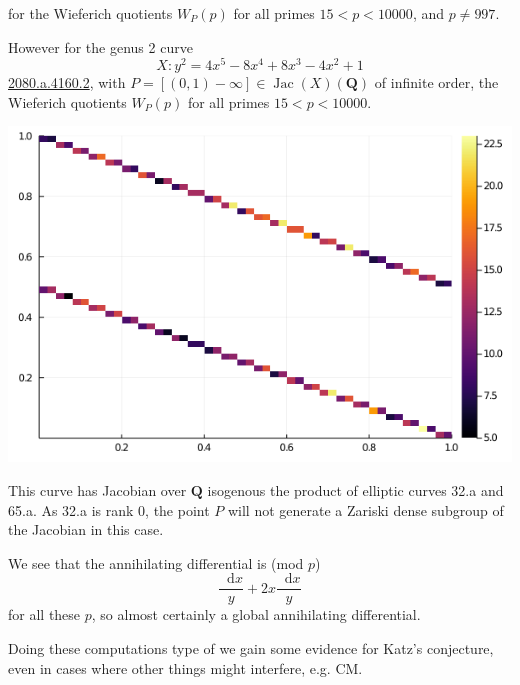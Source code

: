 \documentclass[oneside,11pt,]{article}
\DeclareMathOperator{\Jac}{Jac}
\newcommand{\diff}{\mathop{}\!\mathrm{d}}
\newcommand{\lb}{[}
\newcommand{\rb}{]}
\newcommand{\lt}{<}
\newcommand{\QQ}{\mathbf{Q}}
\begin{document}
for the Wieferich quotients \(W_P(p)\) for all primes \(15 \lt  p \lt  10000\), and \(p \ne 997\).%

However for the genus 2 curve%
\begin{equation*}
X\colon  y^2 = 4x^5 - 8x^4 + 8x^3 - 4x^2 + 1
\end{equation*}
\href{https://www.lmfdb.org/Genus2Curve/Q/2080/a/4160/2}{2080.a.4160.2}, with \(P = \lb (0,1) - \infty \rb \in \Jac(X)(\QQ)\) of infinite order, the Wieferich quotients \(W_P(p)\) for all primes \(15 \lt  p \lt  10000\).

\includegraphics[width=0.9\linewidth]{2080.png}

This curve has Jacobian over \(\QQ\) isogenous the product of elliptic curves 32.a and 65.a. As 32.a is rank 0, the point \(P\) will not generate a Zariski dense subgroup of the Jacobian in this case.%

We see that the annihilating differential is (mod $p$)
\begin{equation*}
\frac{\diff x}{y} +  2x\frac{\diff x}{y}
\end{equation*}
for all these $p$, so almost certainly a global annihilating differential.

Doing these computations type of we gain some evidence for Katz's conjecture, even in cases where other things might interfere, e.g. CM.


\vspace{100em}
\end{document}
